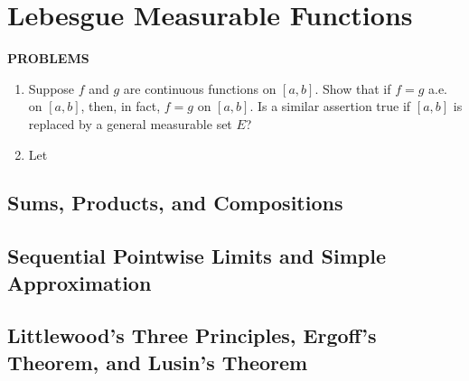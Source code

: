 \chapter{Lebesgue Measurable Functions}

\begin{center}
	\textbf{PROBLEMS}
\end{center}
\begin{enumerate}
	\setcounter{enumi}{0}
	\item Suppose $f$ and $g$ are continuous functions on $[a,b]$. Show that if $f=g$ a.e. on $[a,b]$, then, in fact, $f=g$ on $[a,b]$.
    Is a similar assertion true if $[a,b]$ is replaced by a general measurable set $E$?
    \item Let
\end{enumerate}

\section{Sums, Products, and Compositions}
\section{Sequential Pointwise Limits and Simple Approximation}
\section{Littlewood's Three Principles, Ergoff's Theorem, and Lusin's Theorem}
